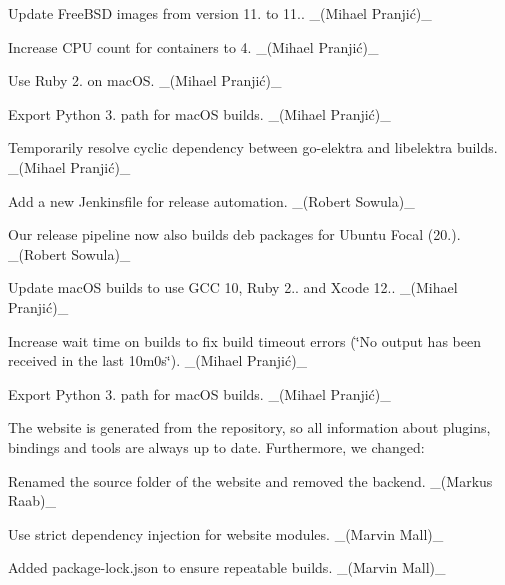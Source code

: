 \begin{DoxyItemize}
\item Update Free\+B\+SD images from version 11. to 11.. \+\_\+(Mihael Pranjić)\+\_\+
\item Increase C\+PU count for containers to 4. \+\_\+(Mihael Pranjić)\+\_\+
\item Use Ruby 2. on mac\+OS. \+\_\+(Mihael Pranjić)\+\_\+
\item Export Python 3. path for mac\+OS builds. \+\_\+(Mihael Pranjić)\+\_\+
\end{DoxyItemize}


\begin{DoxyItemize}
\item Temporarily resolve cyclic dependency between go-\/elektra and libelektra builds. \+\_\+(Mihael Pranjić)\+\_\+
\item Add a new Jenkinsfile for release automation. \+\_\+(\+Robert Sowula)\+\_\+
\item Our release pipeline now also builds deb packages for Ubuntu Focal (20.). \+\_\+(\+Robert Sowula)\+\_\+
\end{DoxyItemize}


\begin{DoxyItemize}
\item Update mac\+OS builds to use G\+CC 10, Ruby 2.. and Xcode 12.. \+\_\+(Mihael Pranjić)\+\_\+
\item Increase wait time on builds to fix build timeout errors (\char`\"{}\+No output has been received in the last 10m0s\char`\"{}). \+\_\+(Mihael Pranjić)\+\_\+
\item Export Python 3. path for mac\+OS builds. \+\_\+(Mihael Pranjić)\+\_\+
\end{DoxyItemize}

The website is generated from the repository, so all information about plugins, bindings and tools are always up to date. Furthermore, we changed\+:


\begin{DoxyItemize}
\item Renamed the source folder of the website and removed the backend. \+\_\+(\+Markus Raab)\+\_\+
\item Use strict dependency injection for website modules. \+\_\+(\+Marvin Mall)\+\_\+
\item Added {\ttfamily package-\/lock.\+json} to ensure repeatable builds. \+\_\+(\+Marvin Mall)\+\_\+
\end{DoxyItemize}

